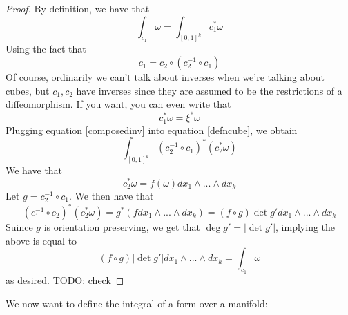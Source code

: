 \documentclass{article}
\begin{document}
\begin{proof}
  By definition, we have that
  \begin{equation}
    \int_{c_1}\omega = \int_{[0, 1]^k}c_1^*\omega
    \label{defncube}
  \end{equation}
  Using the fact that
  \begin{equation}
    c_1 = c_2 \circ (c_2^{-1} \circ c_1)
    \label{composedinv}
  \end{equation}
  Of course, ordinarily we can't talk about inverses when we're talking about cubes, but \(c_1, c_2\) have inverses since they are assumed to be the restrictions of a diffeomorphism. If you want, you can even write that
  \begin{equation}
    c_1^*\omega = \xi^*\omega
  \end{equation}
  Plugging equation \ref{composedinv} into equation \ref{defncube}, we obtain
  \begin{equation}
    \int_{[0, 1]^k}(c_2^{-1} \circ c_1)^*(c_2^*\omega)
  \end{equation}
  We have that
  \begin{equation}
    c_2^*\omega = f(\omega)dx_1 \wedge ... \wedge dx_k
  \end{equation}
  Let \(g = c_2^{-1} \circ c_1\). We then have that
  \begin{equation}
    (c_1^{-1} \circ c_2)^*(c_2^*\omega) = g^*(f dx_1 \wedge ... \wedge dx_k) = (f \circ g)\det g'dx_1 \wedge ... \wedge dx_k
  \end{equation}
  Suince \(g\) is orientation preserving, we get that \(\deg g' = |\det g'|\), implying the above is equal to
  \begin{equation}
    (f \circ g)|\det g'|dx_1 \wedge ... \wedge dx_k = \int_{c_1}\omega
  \end{equation}
  as desired. TODO: check

\end{proof}
We now want to define the integral of a form over a manifold:
\end{document}
